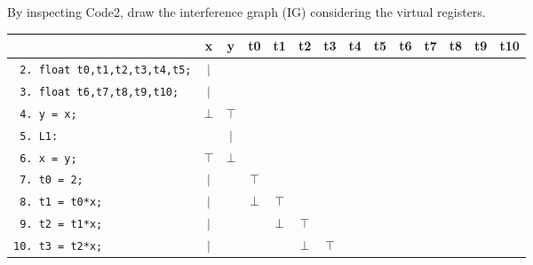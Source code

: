 \documentclass[docid=2021]{comp_exam_round1}
\begin{document}
\newpage

\question
By inspecting Code2, draw the interference graph (IG) considering the virtual registers.

\ansseparator

\noindent
\begin{minipage}{\textwidth}
\begin{center}
    \setlength{\tabcolsep}{0.48em}
    \begin{tabular}{l | c c c c c c c c c c c c c}
                                                & x       & y       & t0      & t1      & t2      & t3      & t4      & t5      & t6      & t7      & t8      & t9      & t10     \\ \hline
        \texttt{ 2. float t0,t1,t2,t3,t4,t5;}   & $\vert$ &         &         &         &         &         &         &         &         &         &         &         &         \\ \hline
        \texttt{ 3. float t6,t7,t8,t9,t10;}     & $\vert$ &         &         &         &         &         &         &         &         &         &         &         &         \\ \hline
        \texttt{ 4. y = x;}                     & $\bot$  & $\top$  &         &         &         &         &         &         &         &         &         &         &         \\ \hline
        \texttt{ 5. L1:}                        &         & $\vert$ &         &         &         &         &         &         &         &         &         &         &         \\ \hline
        \texttt{ 6. x = y;}                     & $\top$  & $\bot$  &         &         &         &         &         &         &         &         &         &         &         \\ \hline
        \texttt{ 7. t0 = 2;}                    & $\vert$ &         & $\top$  &         &         &         &         &         &         &         &         &         &         \\ \hline
        \texttt{ 8. t1 = t0*x;}                 & $\vert$ &         & $\bot$  & $\top$  &         &         &         &         &         &         &         &         &         \\ \hline
        \texttt{ 9. t2 = t1*x;}                 & $\vert$ &         &         & $\bot$  & $\top$  &         &         &         &         &         &         &         &         \\ \hline
        \texttt{10. t3 = t2*x;}                 & $\vert$ &         &         &         & $\bot$  & $\top$  &         &         &         &         &         &         &         \\ \hline

\end{tabular}
\end{center}
\end{minipage}
\end{document}
